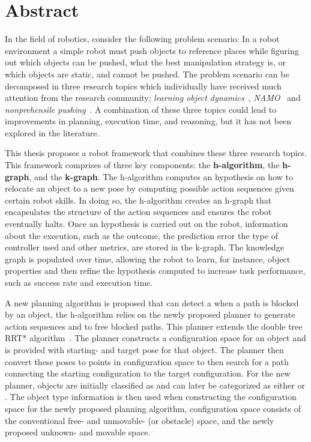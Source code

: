 \chapter*{Abstract}
In the field of robotics, consider the following problem scenario: In a robot environment a simple robot must push objects to reference places while figuring out which objects can be pushed, what the best manipulation strategy is, or which objects are static, and cannot be pushed. The problem scenario can be decomposed in three research topics which individually have received much attention from the research community; \textit{learning object dynamics}~\cite{cong_selfadapting_2020,seegmiller_vehicle_2013}, \textit{\acf{NAMO}}~\cite{chen_fast_2018,elbanhawi_samplingbased_2014,kingston_samplingbased_2018,lavalle_planning_2006} and \textit{nonprehensile pushing}~\cite{arruda_uncertainty_2017,bauza_dataefficient_2018,mericli_pushmanipulation_2015,stuber_featurebased_2018,stuber_let_2020,toussaint_sequenceofconstraints_2022}. A combination of these three topics could lead to improvements in planning, execution time, and reasoning, but it has not been explored in the literature.\bs

This thesis proposes a robot framework that combines these three research topics. This framework comprises of three key components: the \textbf{\acl{h-algorithm}}, the \textbf{\acl{h-graph}}, and the \textbf{\acl{k-graph}}. The \acl{h-algorithm} computes an hypothesis on how to relocate an object to a new pose by computing possible action sequences given certain robot skills. In doing so, the \acl{h-algorithm} creates an \acl{h-graph} that encapsulates the structure of the action sequences and ensures the robot eventually halts. Once an hypothesis is carried out on the robot, information about the execution, such as the outcome, the prediction error the type of controller used and other metrics, are stored in the \acl{k-graph}. The knowledge graph is populated over time, allowing the robot to learn, for instance, object properties and then refine the hypothesis computed to increase task performance, such as success rate and execution time.\bs

A new planning algorithm is proposed that can detect a when a path is blocked by an object, the \acl{h-algorithm} relies on the newly proposed planner to generate action sequences and to free blocked paths. This planner extends the double tree \acl{RRT*} algorithm~\cite{chen_fast_2018}. The planner constructs a configuration space for an object and is provided with starting- and target pose for that object. The planner then convert these poses to points in configuration space to then search for a path connecting the starting configuration to the target configuration. For the new planner, objects are initially classified as  and can later be categorized as either  or . The object type information is then used when constructing the configuration space for the newly proposed planning algorithm, configuration space consists of the conventional free- and unmovable- (or obstacle) space, and the newly proposed unknown- and movable space.\bs

